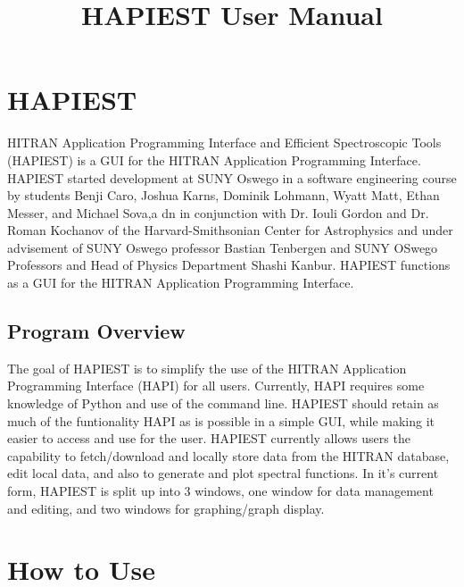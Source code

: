 \documentclass[12pt]{article}
\begin{document}
\title{HAPIEST User Manual} 
\date{}
\maketitle
\thispagestyle{empty}
\newpage

\tableofcontents
\thispagestyle{empty}
\newpage

\setcounter{page}{1}
\section{HAPIEST}
HITRAN Application Programming Interface and Efficient Spectroscopic Tools (HAPIEST) is a GUI for the HITRAN Application Programming Interface. HAPIEST started development at SUNY Oswego in a software engineering course by students Benji Caro, Joshua Karns, Dominik Lohmann, Wyatt Matt, Ethan Messer, and Michael Sova,a dn in conjunction with Dr. Iouli Gordon and Dr. Roman Kochanov of the Harvard-Smithsonian Center for Astrophysics and under advisement of SUNY Oswego professor Bastian Tenbergen and SUNY OSwego Professors and Head of Physics Department Shashi Kanbur. HAPIEST functions as a GUI for the HITRAN Application Programming Interface.
\subsection{Program Overview}
The goal of HAPIEST is to simplify the use of the HITRAN Application Programming Interface (HAPI) for all users. Currently, HAPI requires some knowledge of Python and use of the command line. HAPIEST should retain as much of the funtionality HAPI as is possible in a simple GUI, while making it easier to access and use for the user. HAPIEST currently allows users the capability to fetch/download and locally store data from the HITRAN database, edit local data, and also to generate and plot spectral functions. In it's current form, HAPIEST is split up into 3 windows, one window for data management and editing, and two windows for graphing/graph display.
\section{How to Use}
\end{document}
